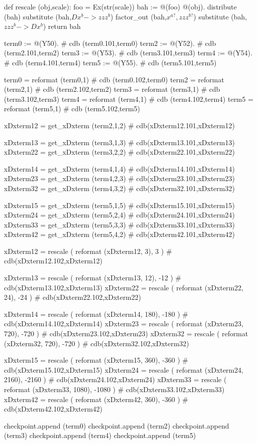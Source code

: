 \documentclass[12pt]{cdblatex}
\begin{document}
\begin{cadabra}
   def rescale (obj,scale):
       foo  = Ex(str(scale))
       bah := @(foo) @(obj).
       distribute  (bah)
       substitute  (bah,$Dx^{b}->zzz^{b}$)
       factor_out  (bah,$x^{a?},zzz^{b?}$)
       substitute  (bah,$zzz^{b}->Dx^{b}$)
       return bah

   term0 := @(Y50).  # cdb (term0.101,term0)
   term2 := @(Y52).  # cdb (term2.101,term2)
   term3 := @(Y53).  # cdb (term3.101,term3)
   term4 := @(Y54).  # cdb (term4.101,term4)
   term5 := @(Y55).  # cdb (term5.101,term5)

   term0 = reformat (term0,1)  # cdb (term0.102,term0)
   term2 = reformat (term2,1)  # cdb (term2.102,term2)
   term3 = reformat (term3,1)  # cdb (term3.102,term3)
   term4 = reformat (term4,1)  # cdb (term4.102,term4)
   term5 = reformat (term5,1)  # cdb (term5.102,term5)

   xDxterm12 = get_xDxterm (term2,1,2)   # cdb(xDxterm12.101,xDxterm12)

   xDxterm13 = get_xDxterm (term3,1,3)   # cdb(xDxterm13.101,xDxterm13)
   xDxterm22 = get_xDxterm (term3,2,2)   # cdb(xDxterm22.101,xDxterm22)

   xDxterm14 = get_xDxterm (term4,1,4)   # cdb(xDxterm14.101,xDxterm14)
   xDxterm23 = get_xDxterm (term4,2,3)   # cdb(xDxterm23.101,xDxterm23)
   xDxterm32 = get_xDxterm (term4,3,2)   # cdb(xDxterm32.101,xDxterm32)

   xDxterm15 = get_xDxterm (term5,1,5)   # cdb(xDxterm15.101,xDxterm15)
   xDxterm24 = get_xDxterm (term5,2,4)   # cdb(xDxterm24.101,xDxterm24)
   xDxterm33 = get_xDxterm (term5,3,3)   # cdb(xDxterm33.101,xDxterm33)
   xDxterm42 = get_xDxterm (term5,4,2)   # cdb(xDxterm42.101,xDxterm42)


   xDxterm12 = rescale ( reformat (xDxterm12,    3),     3 )   # cdb(xDxterm12.102,xDxterm12)

   xDxterm13 = rescale ( reformat (xDxterm13,   12),   -12 )   # cdb(xDxterm13.102,xDxterm13)
   xDxterm22 = rescale ( reformat (xDxterm22,   24),   -24 )   # cdb(xDxterm22.102,xDxterm22)

   xDxterm14 = rescale ( reformat (xDxterm14,  180),  -180 )   # cdb(xDxterm14.102,xDxterm14)
   xDxterm23 = rescale ( reformat (xDxterm23,  720),  -720 )   # cdb(xDxterm23.102,xDxterm23)
   xDxterm32 = rescale ( reformat (xDxterm32,  720),  -720 )   # cdb(xDxterm32.102,xDxterm32)

   xDxterm15 = rescale ( reformat (xDxterm15,  360),  -360 )   # cdb(xDxterm15.102,xDxterm15)
   xDxterm24 = rescale ( reformat (xDxterm24, 2160), -2160 )   # cdb(xDxterm24.102,xDxterm24)
   xDxterm33 = rescale ( reformat (xDxterm33, 1080), -1080 )   # cdb(xDxterm33.102,xDxterm33)
   xDxterm42 = rescale ( reformat (xDxterm42,  360),  -360 )   # cdb(xDxterm42.102,xDxterm42)

   checkpoint.append (term0)
   checkpoint.append (term2)
   checkpoint.append (term3)
   checkpoint.append (term4)
   checkpoint.append (term5)

\end{cadabra}
\end{document}
